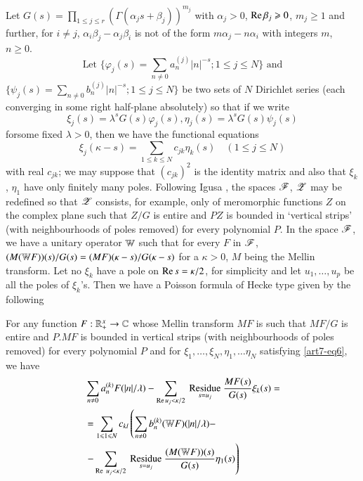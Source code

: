 Let $G (s) = \prod\limits_{1 \leqslant j \leqslant r} (\Gamma (\alpha_j s + \beta_j))^{m_j}$ with $\alpha_j > 0$, $\operatorname{Re} \beta_j \geqslant 0$, $m_j \geqslant 1$ and further, for $i \neq j$, $\alpha_i \beta_j - \alpha_j \beta_i$ is not of the form $m \alpha_j - n \alpha_i$ with integers $m$, $n \geqslant 0$.
$$
\text{Let } \{\varphi_j (s) =\sum\limits_{n \neq 0}  a^{(j)}_n |n|^{-s}; 1 \leqslant j \leqslant N \} \text{ and}
$$
$\{\psi_j (s) = \sum\limits_{n \neq 0} b^{(j)}_n |n|^{-s}; 1 \leqslant j \leqslant N\}$ be two sets of $N$ Dirichlet series (each converging in some right half-plane absolutely) so that if we write 
\begin{equation*}
\xi_j (s) = \lambda^s G (s) \varphi_j (s), \eta_j (s) = \lambda^s G(s) \psi_j (s) \tag*{$(1\leqslant j \leqslant N)$}
\end{equation*}
for\pageoriginale some fixed $\lambda > 0$, then we have the functional equations 
\begin{equation}
\xi_j (\kappa - s) = \sum\limits_{1 \leqslant k \leqslant N} c_{jk} \eta_k (s) \quad (1 \leqslant j \leqslant N) \label{art7-eq6}
\end{equation}
with real $c_{jk}$; we may suppose that $(c_{jk})^2$ is the identity matrix and also that $\xi_k$, $\eta_1$ have only finitely many poles. Following Igusa \cite{art7-I}, the spaces $\mathscr{F}$, $\mathscr{Z}$ may be redefined so that $\mathscr{Z}$ consists, for example, only of meromorphic functions $Z$ on the complex plane such that $Z/G$ is entire and $PZ$ is bounded in `vertical strips' (with neighbourhoods of poles removed) for every polynomial $P$. In the space $\mathscr{F}$, we have a unitary operator $\mathbb{W}$ such that for every $F$ in $\mathscr{F}$, $(M (\mathbb{W} F)) (s)/ G (s) = (MF) (\kappa -s)/ G (\kappa -s)$ for a $\kappa > 0$, $M$ being the Mellin transform. Let no $\xi_k$ have a pole on $\operatorname{Re} s = \kappa /2$, for simplicity and let $u_1,\ldots, u_p$ be all the poles of $\xi_k$'s. Then we have a Poisson formula of Hecke type \cite{art7-R-R} given by the following

\begin{theorem*}
For any function $F: \mathbb{R}^x_+ \to \mathbb{C}$ whose Mellin transform $MF$ is such that $MF/G$ is entire and $P.MF$ is bounded in vertical strips (with neighbourhoods of poles removed) for every polynomial $P$ and for $\xi_1, \ldots, \xi_N, \eta_1, \ldots \eta_N$ satisfying \eqref{art7-eq6}, we have 
\begin{align}
&\sum\limits_{n \neq 0} a^{(k)}_n F (|n|/\lambda) - \sum\limits_{\operatorname{Re} u_j < \kappa /2} {\displaystyle\mathop{\text{ Residue }}_{s = u_j}}\frac{MF (s)}{G(s)} \xi_k(s) = \label{art7-eq7}\\
&= \sum\limits_{1 \leqslant 1 \leqslant N} c_{kl} \left(\sum\limits_{n\neq 0} b^{(k)}_n (\mathbb{W} F) (|n|/\lambda) - \right. \notag\\
& \left. - \sum\limits_{\operatorname{Re} \; u_j < \kappa /2}  {\displaystyle\mathop{\text{ Residue }}_{s = u_j}} \frac{(M (\mathbb{W} F)) (s)}{G (s)} \eta_1 (s) \right)\notag
\end{align}
\end{theorem*}


